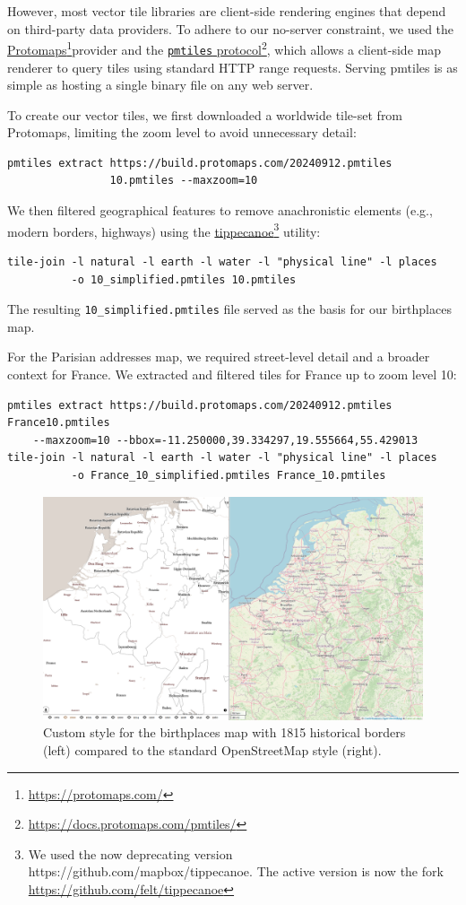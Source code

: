 \documentclass[final]{anthology-ch} %
\begin{document}
However, most vector tile libraries are client-side rendering engines that depend on third-party data providers. To adhere to our no-server constraint, we used the \href{https://protomaps.com/}{Protomaps}\footnote{\url{https://protomaps.com/}}provider and the \href{https://docs.protomaps.com/pmtiles/}{\texttt{pmtiles} protocol}\footnote{\url{https://docs.protomaps.com/pmtiles/}}, which allows a client-side map renderer to query tiles using standard HTTP range requests. Serving pmtiles is as simple as hosting a single binary file on any web server.

To create our vector tiles, we first downloaded a worldwide tile-set from Protomaps, limiting the zoom level to avoid unnecessary detail:
\begin{verbatim}
pmtiles extract https://build.protomaps.com/20240912.pmtiles
                10.pmtiles --maxzoom=10
\end{verbatim}
We then filtered geographical features to remove anachronistic elements (e.g., modern borders, highways) using the \href{https://github.com/felt/tippecanoe}{tippecanoe}\footnote{We used the now deprecating version https://github.com/mapbox/tippecanoe. The active version is now the fork \url{https://github.com/felt/tippecanoe}} utility:
\begin{verbatim}
tile-join -l natural -l earth -l water -l "physical line" -l places
          -o 10_simplified.pmtiles 10.pmtiles
\end{verbatim}
The resulting \texttt{10\_simplified.pmtiles} file served as the basis for our birthplaces map.

For the Parisian addresses map, we required street-level detail and a broader context for France. We extracted and filtered tiles for France up to zoom level 10:
\begin{verbatim}
pmtiles extract https://build.protomaps.com/20240912.pmtiles France10.pmtiles
    --maxzoom=10 --bbox=-11.250000,39.334297,19.555664,55.429013
tile-join -l natural -l earth -l water -l "physical line" -l places
          -o France_10_simplified.pmtiles France_10.pmtiles
\end{verbatim}

\begin{figure}[t!]
  \centering
  \includegraphics[width=1\linewidth]{figures/map_compared.png}
  \caption{Custom style for the birthplaces map with 1815 historical borders (left) compared to the standard OpenStreetMap style (right).}
  \label{fig:map_compared}
\end{figure}
\end{document}
